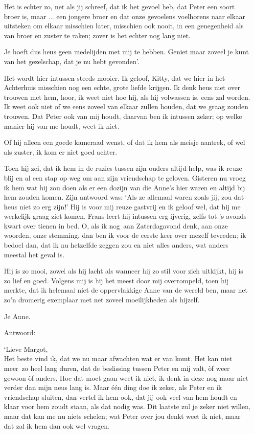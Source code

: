 \documentclass{book}
\begin{document}
Het is echter zo, net als jij schreef, dat ik het gevoel heb, dat Peter
een soort broer is, maar ... een jongere broer en dat onze gevoelens
voelhorens naar elkaar uitsteken om elkaar misschien later, misschien
ook nooit, in een genegenheid als van broer en zuster te raken; zover is
het echter nog lang niet.

Je hoeft dus heus geen medelijden met mij te hebben. Geniet maar zoveel
je kunt van het gezelschap, dat je nu hebt gevonden'.

Het wordt hier intussen steeds mooier. Ik geloof, Kitty, dat we hier in
het Achterhuis misschien nog een echte, grote liefde krijgen. Ik denk
heus niet over trouwen met hem, hoor, ik weet niet hoe hij, als hij
volwassen is, eens zal worden. Ik weet ook niet of we eens zoveel van
elkaar zullen houden, dat we graag zouden trouwen. Dat Peter ook van mij
houdt, daarvan ben ik intussen zeker; op welke manier hij van me houdt,
weet ik niet.

Of hij alleen een goede kameraad wenst, of dat ik hem als meisje
aantrek, of wel als zuster, ik kom er niet goed achter.

Toen hij zei, dat ik hem in de ruzies tussen zijn ouders altijd help,
was ik reuze blij en al een stap op weg om aan zijn vriendschap te
geloven. Gisteren nu vroeg ik hem wat hij zou doen als er een dozijn van
die Anne's hier waren en altijd bij hem zouden komen. Zijn antwoord was:
`Als ze allemaal waren zoals jij, zou dat heus niet zo erg zijn!' Hij is
voor mij reuze gastvrij en ik geloof wel, dat hij me werkelijk graag
ziet komen. Frans leert hij intussen erg ijverig, zelfs tot 's avonds
kwart over tienen in bed. O, als ik nog~aan Zaterdagavond denk, aan onze
woorden, onze stemming, dan ben ik voor de eerste keer over mezelf
tevreden; ik bedoel dan, dat ik nu hetzelfde zeggen zou en niet alles
anders, wat anders meestal het geval is.

Hij is zo mooi, zowel als hij lacht als wanneer hij zo stil voor zich
uitkijkt, hij is zo lief en goed. Volgens mij is hij het meest door mij
overrompeld, toen hij merkte, dat ik helemaal niet de oppervlakkige Anne
van de wereld ben, maar net zo'n dromerig exemplaar met net zoveel
moeilijkheden als hijzelf.

Je Anne.

Antwoord:

`Lieve Margot,\\Het beste vind ik, dat we nu maar afwachten wat er van
komt. Het kan niet meer~zo heel lang duren, dat de beslissing tussen
Peter en mij valt, òf weer gewoon òf anders. Hoe dat moet gaan weet ik
niet, ik denk in deze nog maar niet verder dan mijn neus lang is. Maar
één ding doe ik zeker, als Peter en ik vriendschap sluiten, dan vertel
ik hem ook, dat jij ook veel van hem houdt en klaar voor hem zoudt
staan, als dat nodig was. Dit laatste zul je zeker niet willen, maar dat
kan me nu niets schelen; wat Peter over jou denkt weet ik niet, maar dat
zal ik hem dan ook wel vragen.
\end{document}
